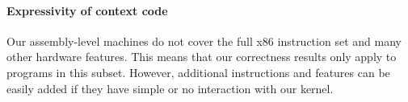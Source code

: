 
\paragraph{Expressivity of context code} 
Our assembly-level machines do not cover the full x86 instruction set
and many other hardware features. This means that our correctness results 
only apply to programs in this subset. However, additional instructions 
and features can be easily added if they have simple or no interaction
with our kernel. 

